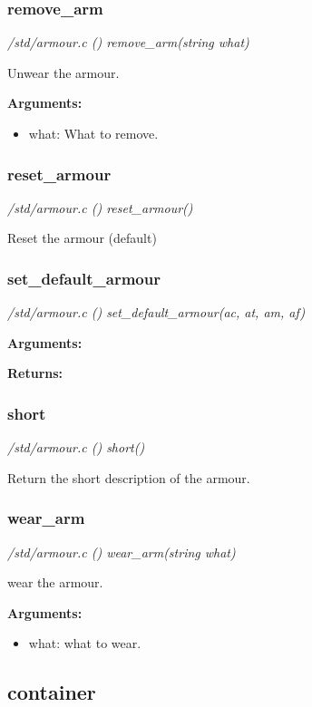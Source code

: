 \subsubsection{remove\_arm}

{\em /std/armour.c () remove\_arm(string what)}

Unwear the armour.

{\bf Arguments:}
\begin{itemize}
\item     what: What to remove.
\end{itemize}


\subsubsection{reset\_armour}

{\em /std/armour.c () reset\_armour()}

Reset the armour (default)


\subsubsection{set\_default\_armour}

{\em /std/armour.c () set\_default\_armour(ac, at, am, af)}


{\bf Arguments:}

{\bf Returns:} 


\subsubsection{short}

{\em /std/armour.c () short()}

Return the short description of the armour.


\subsubsection{wear\_arm}

{\em /std/armour.c () wear\_arm(string what)}

wear the armour.

{\bf Arguments:}
\begin{itemize}
\item     what: what to wear.
\end{itemize}


\subsection{container}
